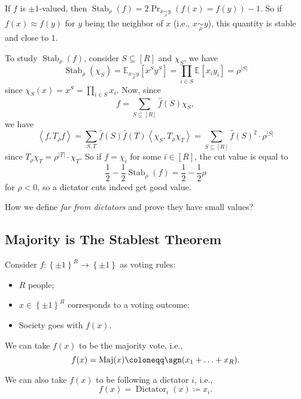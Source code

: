 \begin{remark}
	If \(f\) is \(\pm 1\)-valued, then \(\mathop{\mathrm{Stab}}_\rho (f) = 2\Pr_{x \underset{\rho }{\sim }y }(f(x) = f(y)) -1 \). So if \(f(x) \approx f(y)\) for \(y\) being the neighbor of \(x\) (i.e., \(x \underset{\rho }{\sim }y \)), this quantity is stable and close to \(1\).
\end{remark}

To study \(\mathop{\mathrm{Stab}}_\rho (f)\), consider \(S \subseteq [R]\) and \(\chi _S\), we have
\[
	\mathop{\mathrm{Stab}}_\rho (\chi _S)
	= \mathbb{E}_{x \underset{\rho }{\sim }y }\left[x^S y^S \right]
	= \prod_{i\in S} \mathbb{E}_{}\left[x_i y_i \right]
	= \rho ^{\vert S \vert }
\]
since \(\chi _S(x) = x^S = \prod_{i\in S}^{} x_i\). Now, since
\[
	f = \sum_{S \subseteq [R]} \hat{f} (S) \chi _S,
\]
we have
\[
	\left\langle f, T_{\rho }f \right\rangle
	= \sum_{S, T} \hat{f} (S) \hat{f} (T) \left\langle \chi _S, T_\rho \chi _T \right\rangle
	= \sum_{S\subseteq [R]} \hat{f} (S)^2 \cdot \rho ^{\vert S \vert }
\]
since \(T_\rho \chi _T = \rho ^{\vert T \vert }\cdot \chi _T\). So if \(f = \chi _i\) for some \(i\in [R]\), the cut value is equal to
\[
	\frac{1}{2} - \frac{1}{2} \mathop{\mathrm{Stab}}_\rho (f) = \frac{1}{2} - \frac{1}{2}\rho
\]
for \(\rho < 0\), so a dictator cuts indeed get good value.

\begin{problem*}
	How we define \emph{far from dictators} and prove they have small values?
\end{problem*}

\subsection{Majority is The Stablest Theorem}
Consider \(f\colon \left\{ \pm 1 \right\} ^R \to \left\{ \pm 1 \right\} \) as voting rules:
\begin{itemize}
	\item \(R\) people;
	\item \(x\in \left\{ \pm 1 \right\} ^R\) corresponds to a voting outcome;
	\item Society goes with \(f(x)\).
\end{itemize}

\begin{eg}[Majority]
	We can take \(f(x)\) to be the majority vote, i.e.,
	\[
		f(x) = \mathop{\mathrm{Maj}}(x) \coloneqq \sgn(x_1 + \ldots + x_R ).
	\]
\end{eg}

\begin{eg}[Dictator]
	We can also take \(f(x)\) to be following a dictator \(i\), i.e.,
	\[
		f(x) = \mathop{\mathrm{Dictator}}\nolimits_i(x) \coloneqq x_i.
	\]
\end{eg}

